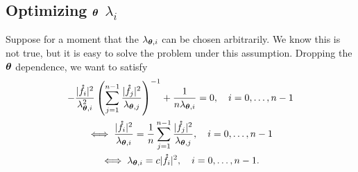 \documentclass{amsart}
\begin{document}
\subsection{Optimizing  $\boldsymbol{\theta}$ $\lambda_i$}
Suppose for a moment that the $\lambda_{\boldsymbol{\theta},i}$ can be chosen arbitrarily.   We know this is not true, but it is easy to solve the problem under this assumption.  Dropping the $\boldsymbol{\theta}$ dependence, we want to satisfy
\begin{multline*} 
    - \frac{\lvert\mathring{f}_i\rvert^2}{\lambda_{\boldsymbol{\theta},i}^2} \left( \sum_{j=1}^{n-1} \frac{\lvert\mathring{f}_j\rvert^2}{\lambda_{\boldsymbol{\theta}, j}} \right)^{-1} + \frac 1{n\lambda_{\boldsymbol{\theta},i}} = 0, \quad i = 0, \ldots, n-1
    \\
    \iff
    \frac{\lvert\mathring{f}_i\rvert^2}{\lambda_{\boldsymbol{\theta},i}} = \frac 1n \sum_{j=1}^{n-1} \frac{\lvert\mathring{f}_j\rvert^2}{\lambda_{\boldsymbol{\theta},j}}, \quad i = 0, \ldots, n-1
    \\
    \iff
    \lambda_{\boldsymbol{\theta},i} = c \lvert\mathring{f}_i\rvert^2, \quad i = 0, \ldots, n-1.
\end{multline*}



\end{document}
